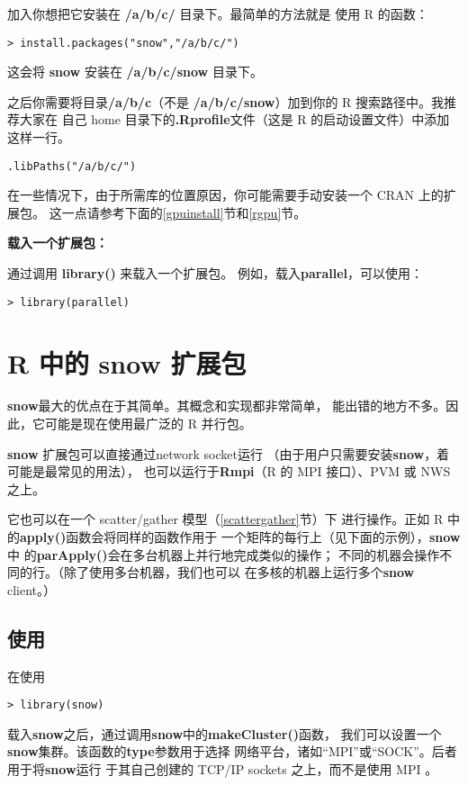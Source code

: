 加入你想把它安装在 {\bf /a/b/c/} 目录下。最简单的方法就是
使用 R 的函数：

\begin{lstlisting}
> install.packages("snow","/a/b/c/")
\end{lstlisting}

这会将 {\bf snow} 安装在 {\bf /a/b/c/{\bf snow}} 目录下。

之后你需要将目录{\bf /a/b/c}（不是{\bf
/a/b/c/snow}）加到你的 R 搜索路径中。我推荐大家在
自己 home 目录下的{\bf .Rprofile}文件（这是 R 的启动设置文件）中添加这样一行。
\begin{lstlisting}
.libPaths("/a/b/c/")
\end{lstlisting}

在一些情况下，由于所需库的位置原因，你可能需要手动安装一个 CRAN 上的扩展包。
这一点请参考下面的\ref{gpuinstall}节和\ref{rgpu}节。

{\bf 载入一个扩展包：}

通过调用 {\bf library()} 来载入一个扩展包。
例如，载入{\bf parallel}，可以使用：
\begin{lstlisting}
> library(parallel)
\end{lstlisting}

\section{R 中的 snow 扩展包}
\label{snow}

{\bf snow}最大的优点在于其简单。其概念和实现都非常简单，
能出错的地方不多。因此，它可能是现在使用最广泛的 R 并行包。


{\bf snow} 扩展包可以直接通过network socket运行
（由于用户只需要安装{\bf snow}，着可能是最常见的用法），
也可以运行于{\bf Rmpi}（R 的 MPI 接口）、PVM 或 NWS之上。

它也可以在一个 scatter/gather 模型（\ref{scattergather}节）下
进行操作。正如 R 中的{\bf apply()}函数会将同样的函数作用于
一个矩阵的每行上（见下面的示例），{\bf snow}中
的{\bf parApply()}会在多台机器上并行地完成类似的操作；
不同的机器会操作不同的行。（除了使用多台机器，我们也可以
在多核的机器上运行多个{\bf snow} client。）

\subsection{使用}

在使用
\begin{lstlisting}
> library(snow)
\end{lstlisting}
载入{\bf snow}之后，通过调用{\bf snow}中的{\bf makeCluster()}函数，
我们可以设置一个{\bf snow}集群。该函数的{\bf type}参数用于选择
网络平台，诸如``MPI''或``SOCK''。后者用于将{\bf snow}运行
于其自己创建的 TCP/IP sockets 之上，而不是使用 MPI 。

